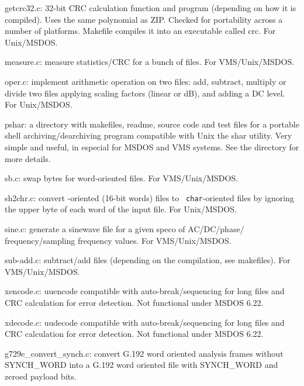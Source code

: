 \begin{Descr}{40mm}
\item[getcrc32.c:]
         32-bit CRC calculation function and program (depending on
         how it is compiled). Uses the same polynomial as
         ZIP. Checked for portability across a number of
         platforms. Makefile compiles it into an executable called
         crc. For Unix/MSDOS.

\item[measure.c:]
        measure statistics/CRC for a bunch of files.  For
        VMS/Unix/MSDOS.

\item[oper.c:]
            implement arithmetic operation on two files: add,
            subtract, multiply or divide two files applying
            scaling factors (linear or dB), and adding a DC
            level. For Unix/MSDOS.

\item[pshar:]
        a directory with makefiles, readme, source code and
        test files for a portable shell archiving/dearchiving
        program compatible with Unix the shar utility. Very
        simple and useful, in especial for MSDOS and VMS
        systems. See the directory for more details.

\item[sb.c:]
        swap bytes for word-oriented files. For
        VMS/Unix/MSDOS.

\item[sh2chr.c:]
           convert \short-oriented (16-bit words) files to {\tt
           char}-oriented files by ignoring the upper byte of each
           word of the input file. For Unix/MSDOS.

\item[sine.c:]
        generate a sinewave file for a given speco of
        AC/DC/phase/ frequency/sampling frequency values. For
        VMS/Unix/MSDOS.

\item[sub-add.c:]
        subtract/add files (depending on the compilation, see
        makefiles). For VMS/Unix/MSDOS.


\item[xencode.c:]
        uuencode compatible with auto-break/sequencing for
        long files and CRC calculation for error
        detection. Not functional under MSDOS 6.22.

\item[xdecode.c:]
        uudecode compatible with auto-break/sequencing for
        long files and CRC calculation for error
        detection. Not functional under MSDOS 6.22.

\item[g729e\_convert\_synch.c:]
        convert G.192 word oriented analysis 
        frames without SYNCH\_WORD into a G.192 word oriented 
        file with SYNCH\_WORD and zeroed payload bits. 
         
\end{Descr}


